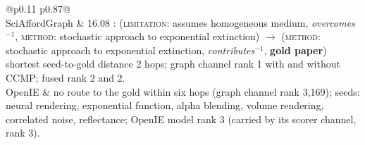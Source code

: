 \begin{table}[H]
\centering
\resulttablestyle
\setlength{\tabcolsep}{5pt}
\renewcommand{\arraystretch}{1.25}
\begin{tabular}{@{}p{0.11\linewidth} p{0.87\linewidth}@{}}
\toprule
{} \\
\midrule
SciAfford\-Graph &
16.08 :\; (\textsc{limitation}: assumes homogeneous medium,\; \textit{overcomes}$^{-1}$,\;
\textsc{method}: stochastic approach to exponential extinction) $\rightarrow$
(\textsc{method}: stochastic approach to exponential extinction,\; \textit{contributes}$^{-1}$,\; \textbf{gold paper}) \newline
{\footnotesize shortest seed-to-gold distance 2 hops; graph channel rank 1 with and without CCMP; fused rank 2 and 2.} \\
OpenIE &
no route to the gold within six hops (graph channel rank 3{,}169); seeds: neural rendering, exponential function,
alpha blending, volume rendering, correlated noise, reflectance; OpenIE model rank 3 (carried by its scorer channel, rank 3). \\
\bottomrule
\end{tabular}
\caption{Path interpretations for Figure~\ref{fig:qual-cs-render}. Top-weighted route from the query's seed
frames to the gold under the trained reasoner (beam search over the gradient of the graph score with respect
to each layer's edge weights, as in NBFNet and GFM-RAG); $r^{-1}$ is the inverse relation; grey weight is
the same weights with the CCMP gate off. The frame graph states the physical reason in two typed hops. The
entity graph has the paper but no route to it: its edges record which terms a paper mentions, not what
assumption a method removes.}
\label{tab:paths-cs-render}
\end{table}
